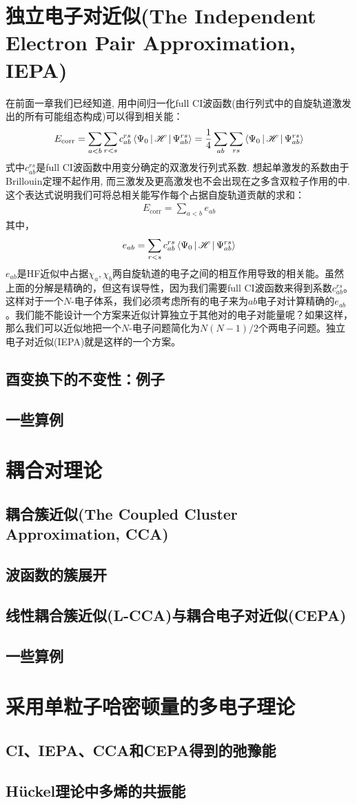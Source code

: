 \section{独立电子对近似(The Independent Electron Pair Approximation, IEPA)}
在前面一章我们已经知道, 用中间归一化full CI波函数(由\hft 行列式中的自旋轨道激发出的所有可能组态构成)可以得到相关能：
\begin{align}
E_\mathrm{corr} = \sum_{a<b}\sum_{r<s}c_{ab}^{rs}\Braket{\Psi_0|\mathscr{H}|\Psi_{ab}^{rs}} = \frac{1}{4}\sum_{ab}\sum_{rs}\Braket{\Psi_0|\mathscr{H}|\Psi_{ab}^{rs}}
\end{align}
式中$c_{ab}^{rs}$是full CI波函数中用变分确定的双激发行列式系数. 想起单激发的系数由于Brillouin定理不起作用, 而三激发及更高激发也不会出现在之多含双粒子作用的\ha 中. 这个表达式说明我们可将总相关能写作每个占据自旋轨道贡献的求和：
\begin{align}
E_\mathrm{corr} = \sum_{a<b}e_{ab}
\end{align}
其中，
\begin{equation}\label{key}
e_{ab} = \sum_{r<s} c_{ab}^{rs} \Braket{\Psi_0 | \mathscr{H} | \Psi_{ab}^{rs}}
\end{equation}
$ e_{ab} $是HF近似中占据$ \chi_a,\chi_b $两自旋轨道的电子之间的相互作用导致的相关能。虽然上面的分解是精确的，但这有误导性，因为我们需要full CI波函数来得到系数$ c_{ab}^{rs} $。这样对于一个$ N $-电子体系，我们必须考虑所有的电子来为$ ab $电子对计算精确的$ e_{ab} $。我们能不能设计一个方案来近似计算独立于其他对的电子对能量呢？如果这样，那么我们可以近似地把一个$ N $-电子问题简化为$ N(N-1)/2 $个两电子问题。独立电子对近似(IEPA)就是这样的一个方案。
\subsection{酉变换下的不变性：例子}
\subsection{一些算例}

\section{耦合对理论}
\subsection{耦合簇近似(The Coupled Cluster Approximation, CCA)}
\subsection{波函数的簇展开}
\subsection{线性耦合簇近似(L-CCA)与耦合电子对近似(CEPA)}
\subsection{一些算例}

\section{采用单粒子哈密顿量的多电子理论}
\subsection{CI、IEPA、CCA和CEPA得到的弛豫能}
\subsection{H\"uckel理论中多烯的共振能}
